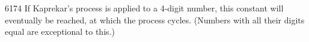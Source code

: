  6174
If Kaprekar's process is applied to a 4-digit number, this
constant will eventually be reached, at which the process cycles.
(Numbers with all their digits equal are exceptional to this.)
